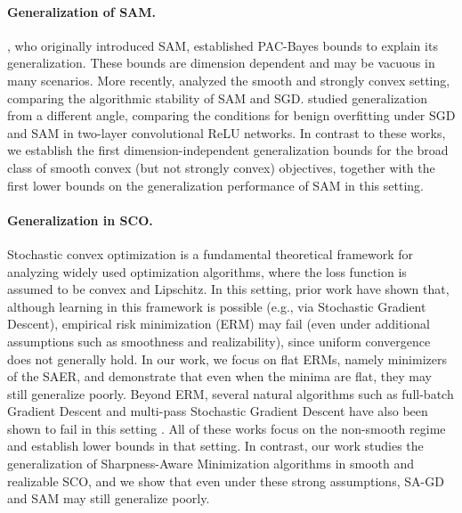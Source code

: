 \documentclass[11pt]{article}
\begin{document}
\paragraph{Generalization of SAM.}  
\citet{foret2021sharpness}, who originally introduced SAM, established PAC-Bayes bounds to explain its generalization. 
These bounds are dimension dependent and may be vacuous in many scenarios. 
More recently, \citet{tan2025stabilizing} analyzed the smooth and strongly convex setting, comparing the algorithmic stability of SAM and SGD.  
\citet{chen2024does} studied generalization from a different angle, comparing the conditions for benign overfitting under SGD and SAM in two-layer convolutional ReLU networks. 
In contrast to these works, we establish the first dimension-independent generalization bounds for the broad class of smooth convex (but not strongly convex) objectives, together with the first lower bounds on the generalization performance of SAM in this setting.  



\paragraph{Generalization in SCO.}
Stochastic convex optimization is a fundamental theoretical framework for analyzing widely used optimization algorithms, where the loss function is assumed to be convex and Lipschitz. In this setting, prior work \citep{shalev2010learnability,feldman2016generalization,carmon2023sample} have shown that, although learning in this framework is possible (e.g., via Stochastic Gradient Descent), empirical risk minimization (ERM) may fail (even under additional assumptions such as smoothness and realizability), since uniform convergence does not generally hold. 
In our work, we focus on flat ERMs, namely minimizers of the SAER, and demonstrate that even when the minima are flat, they may still generalize poorly.
Beyond ERM, several natural algorithms such as full-batch Gradient Descent and multi-pass Stochastic Gradient Descent have also been shown to fail in this setting \citep{amir2021sgd,livni2024sample,schliserman2024dimension,vansover2025rapid}.
All of these works focus on the non-smooth regime and establish lower bounds in that setting. In contrast, our work studies the generalization of Sharpness-Aware Minimization algorithms in smooth and realizable SCO, and we show that even under these strong assumptions, SA-GD and SAM may still generalize poorly.
\end{document}
